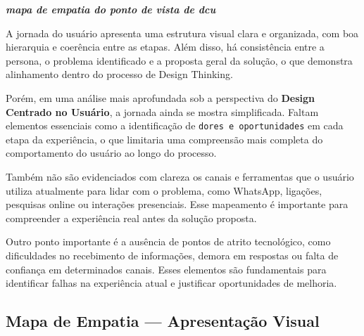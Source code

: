 \documentclass[
  sigconf,
  nonacm, %
  language=portuguese
]{acmart}
\newcommand{\statusok}[1]{{\small\bfseries\color{cgood}#1}}
\begin{document}
\textit{\textbf{mapa de empatia do ponto de vista de dcu}}

A jornada do usuário apresenta uma estrutura visual clara e organizada, com boa hierarquia e coerência entre as etapas. Além disso, há consistência entre a persona, o problema identificado e a proposta geral da solução, o que demonstra alinhamento dentro do processo de Design Thinking.

Porém, em uma análise mais aprofundada sob a perspectiva do \textbf{Design Centrado no Usuário}, a jornada ainda se mostra simplificada. Faltam elementos essenciais como a identificação de \texttt{dores e oportunidades} em cada etapa da experiência, o que limitaria uma compreensão mais completa do comportamento do usuário ao longo do processo.

Também não são evidenciados com clareza os canais e ferramentas que o usuário utiliza atualmente para lidar com o problema, como WhatsApp, ligações, pesquisas online ou interações presenciais. Esse mapeamento é importante para compreender a experiência real antes da solução proposta.

Outro ponto importante é a ausência de pontos de atrito tecnológico, como dificuldades no recebimento de informações, demora em respostas ou falta de confiança em determinados canais. Esses elementos são fundamentais para identificar falhas na experiência atual e justificar oportunidades de melhoria.

\subsection{Mapa de Empatia — Apresentação Visual}

\noindent\statusok{1,50\,/\,1,50 pts · Completo}
\end{document}
